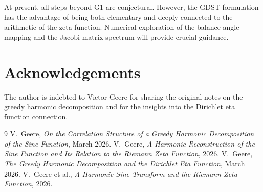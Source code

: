 \documentclass[11pt,a4paper]{article}
\theoremstyle{remark}
\begin{document}
At present, all steps beyond G1 are conjectural.  However, the GDST formulation has the advantage of being both elementary and deeply connected to the arithmetic of the zeta function.  Numerical exploration of the balance angle mapping and the Jacobi matrix spectrum will provide crucial guidance.

\section*{Acknowledgements}
The author is indebted to Victor Geere for sharing the original notes on the greedy harmonic decomposition and for the insights into the Dirichlet eta function connection.

\begin{thebibliography}{9}
V.~Geere, \emph{On the Correlation Structure of a Greedy Harmonic Decomposition of the Sine Function}, March 2026.
V.~Geere, \emph{A Harmonic Reconstruction of the Sine Function and Its Relation to the Riemann Zeta Function}, 2026.
V.~Geere, \emph{The Greedy Harmonic Decomposition and the Dirichlet Eta Function}, March 2026.
V.~Geere et al., \emph{A Harmonic Sine Transform and the Riemann Zeta Function}, 2026.
\end{thebibliography}
\end{document}
